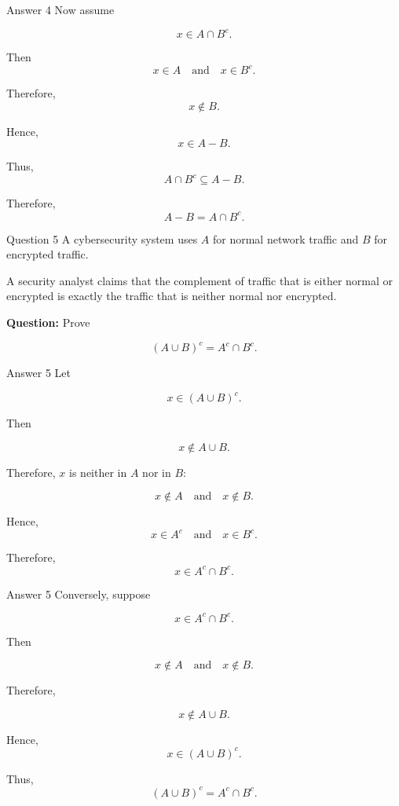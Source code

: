 \begin{frame}{Answer 4}
Now assume

$$
x\in A\cap B^c.
$$

Then
$$
x\in A
\quad\text{and}\quad
x\in B^c.
$$

Therefore,
$$
x\notin B.
$$

Hence,
$$
x\in A-B.
$$

Thus,
$$
A\cap B^c\subseteq A-B.
$$

Therefore,
$$
\boxed{A-B=A\cap B^c}.
$$

\end{frame}


\begin{frame}{Question 5}
A cybersecurity system uses $A$ for normal network traffic and $B$ for encrypted traffic.

A security analyst claims that the complement of traffic that is either normal or encrypted is exactly the traffic that is neither normal nor encrypted.

\textbf{Question:} Prove

$$
(A\cup B)^c=A^c\cap B^c.
$$

\end{frame}

\begin{frame}{Answer 5}
Let

$$
x\in(A\cup B)^c.
$$

Then

$$
x\notin A\cup B.
$$

Therefore, $x$ is neither in $A$ nor in $B$:

$$
x\notin A
\quad\text{and}\quad
x\notin B.
$$

Hence,
$$
x\in A^c
\quad\text{and}\quad
x\in B^c.
$$

Therefore,
$$
x\in A^c\cap B^c.
$$

\end{frame}

\begin{frame}{Answer 5}
Conversely, suppose

$$
x\in A^c\cap B^c.
$$

Then

$$
x\notin A
\quad\text{and}\quad
x\notin B.
$$

Therefore,

$$
x\notin A\cup B.
$$

Hence,
$$
x\in(A\cup B)^c.
$$

Thus,
$$
\boxed{(A\cup B)^c=A^c\cap B^c}.
$$

\end{frame}

